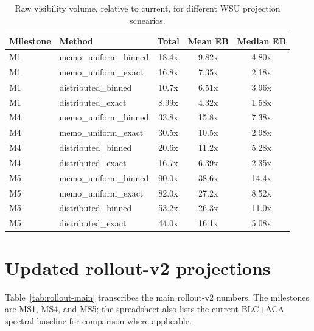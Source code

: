 \documentclass[11pt]{article}
\begin{document}
\begin{table}[h]
\centering
\caption{Raw visibility volume, relative to current, for different WSU projection scnearios.}
\label{tab:sidecarproj}
\begin{tabular}{llccc}
\toprule
Milestone & Method & Total & Mean EB & Median EB \\
\midrule
M1 & memo\_uniform\_binned & 18.4x & 9.82x & 4.80x \\
M1 & memo\_uniform\_exact & 16.8x & 7.35x & 2.18x \\
M1 & distributed\_binned & 10.7x & 6.51x & 3.96x \\
M1 & distributed\_exact & 8.99x & 4.32x & 1.58x \\
\addlinespace
M4 & memo\_uniform\_binned & 33.8x & 15.8x & 7.38x \\
M4 & memo\_uniform\_exact & 30.5x & 10.5x & 2.98x \\
M4 & distributed\_binned & 20.6x & 11.2x & 5.28x \\
M4 & distributed\_exact & 16.7x & 6.39x & 2.35x \\
\addlinespace
M5 & memo\_uniform\_binned & 90.0x & 38.6x & 14.4x \\
M5 & memo\_uniform\_exact & 82.0x & 27.2x & 8.52x \\
M5 & distributed\_binned & 53.2x & 26.3x & 11.0x \\
M5 & distributed\_exact & 44.0x & 16.1x & 5.08x \\
\bottomrule
\end{tabular}
\end{table}

\section{Updated rollout-v2 projections}
Table~\ref{tab:rollout-main} transcribes the main rollout-v2 numbers.  The
milestones are MS1, MS4, and MS5; the spreadsheet also lists the current
BLC+ACA spectral baseline for comparison where applicable.
\end{document}
